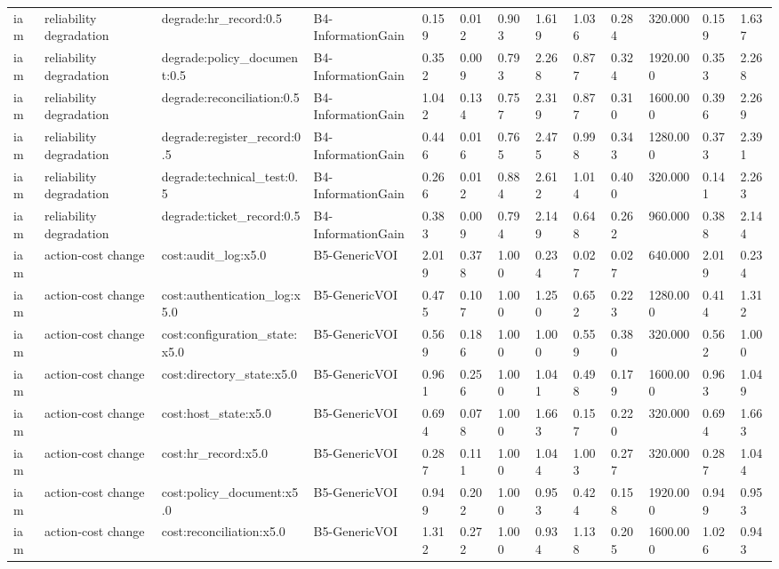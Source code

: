 \begin{table}[!ht]
{\begin{tabular}{lllllllllllll}
iam & reliability degradation & degrade:hr\_record:0.5 & B4-InformationGain & 0.159 & 0.012 & 0.903 & 1.619 & 1.036 & 0.284 & 320.000 & 0.159 & 1.637 \\
iam & reliability degradation & degrade:policy\_document:0.5 & B4-InformationGain & 0.352 & 0.009 & 0.793 & 2.268 & 0.877 & 0.324 & 1920.000 & 0.353 & 2.268 \\
iam & reliability degradation & degrade:reconciliation:0.5 & B4-InformationGain & 1.042 & 0.134 & 0.757 & 2.319 & 0.877 & 0.310 & 1600.000 & 0.396 & 2.269 \\
iam & reliability degradation & degrade:register\_record:0.5 & B4-InformationGain & 0.446 & 0.016 & 0.765 & 2.475 & 0.998 & 0.343 & 1280.000 & 0.373 & 2.391 \\
iam & reliability degradation & degrade:technical\_test:0.5 & B4-InformationGain & 0.266 & 0.012 & 0.884 & 2.612 & 1.014 & 0.400 & 320.000 & 0.141 & 2.263 \\
iam & reliability degradation & degrade:ticket\_record:0.5 & B4-InformationGain & 0.383 & 0.009 & 0.794 & 2.149 & 0.648 & 0.262 & 960.000 & 0.388 & 2.144 \\
iam & action-cost change & cost:audit\_log:x5.0 & B5-GenericVOI & 2.019 & 0.378 & 1.000 & 0.234 & 0.027 & 0.027 & 640.000 & 2.019 & 0.234 \\
iam & action-cost change & cost:authentication\_log:x5.0 & B5-GenericVOI & 0.475 & 0.107 & 1.000 & 1.250 & 0.652 & 0.223 & 1280.000 & 0.414 & 1.312 \\
iam & action-cost change & cost:configuration\_state:x5.0 & B5-GenericVOI & 0.569 & 0.186 & 1.000 & 1.000 & 0.559 & 0.380 & 320.000 & 0.562 & 1.000 \\
iam & action-cost change & cost:directory\_state:x5.0 & B5-GenericVOI & 0.961 & 0.256 & 1.000 & 1.041 & 0.498 & 0.179 & 1600.000 & 0.963 & 1.049 \\
iam & action-cost change & cost:host\_state:x5.0 & B5-GenericVOI & 0.694 & 0.078 & 1.000 & 1.663 & 0.157 & 0.220 & 320.000 & 0.694 & 1.663 \\
iam & action-cost change & cost:hr\_record:x5.0 & B5-GenericVOI & 0.287 & 0.111 & 1.000 & 1.044 & 1.003 & 0.277 & 320.000 & 0.287 & 1.044 \\
iam & action-cost change & cost:policy\_document:x5.0 & B5-GenericVOI & 0.949 & 0.202 & 1.000 & 0.953 & 0.424 & 0.158 & 1920.000 & 0.949 & 0.953 \\
iam & action-cost change & cost:reconciliation:x5.0 & B5-GenericVOI & 1.312 & 0.272 & 1.000 & 0.934 & 1.138 & 0.205 & 1600.000 & 1.026 & 0.943 \\

\end{tabular}}
\end{table}

